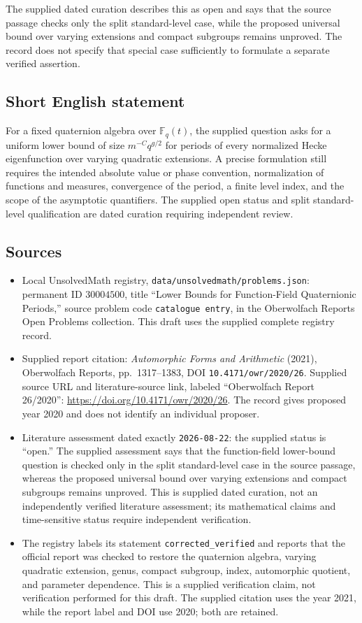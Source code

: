 \documentclass[11pt]{article}
\begin{document}
The supplied dated curation describes this as open and says that the source passage checks only the split standard-level case, while the proposed universal bound over varying extensions and compact subgroups remains unproved. The record does not specify that special case sufficiently to formulate a separate verified assertion.
\subsection{Short English statement}
For a fixed quaternion algebra over \(\mathbb F_q(t)\), the supplied question asks for a uniform lower bound of size \(m^{-C}q^{g/2}\) for periods of every normalized Hecke eigenfunction over varying quadratic extensions. A precise formulation still requires the intended absolute value or phase convention, normalization of functions and measures, convergence of the period, a finite level index, and the scope of the asymptotic quantifiers. The supplied open status and split standard-level qualification are dated curation requiring independent review.
\subsection{Sources}
\begin{itemize}
\item Local UnsolvedMath registry, \texttt{data/unsolvedmath/problems.json}: permanent ID \(30004500\), title ``Lower Bounds for Function-Field Quaternionic Periods,'' source problem code \texttt{catalogue entry}, in the Oberwolfach Reports Open Problems collection. This draft uses the supplied complete registry record.
\item Supplied report citation: \emph{Automorphic Forms and Arithmetic} (2021), Oberwolfach Reports, pp.\ 1317--1383, DOI \texttt{10.4171/owr/2020/26}. Supplied source URL and literature-source link, labeled ``Oberwolfach Report 26/2020'': \url{https://doi.org/10.4171/owr/2020/26}. The record gives proposed year 2020 and does not identify an individual proposer.
\item Literature assessment dated exactly \texttt{2026-08-22}: the supplied status is ``open.'' The supplied assessment says that the function-field lower-bound question is checked only in the split standard-level case in the source passage, whereas the proposed universal bound over varying extensions and compact subgroups remains unproved. This is supplied dated curation, not an independently verified literature assessment; its mathematical claims and time-sensitive status require independent verification.
\item The registry labels its statement \texttt{corrected\_verified} and reports that the official report was checked to restore the quaternion algebra, varying quadratic extension, genus, compact subgroup, index, automorphic quotient, and parameter dependence. This is a supplied verification claim, not verification performed for this draft. The supplied citation uses the year 2021, while the report label and DOI use 2020; both are retained.
\end{itemize}
\end{document}
